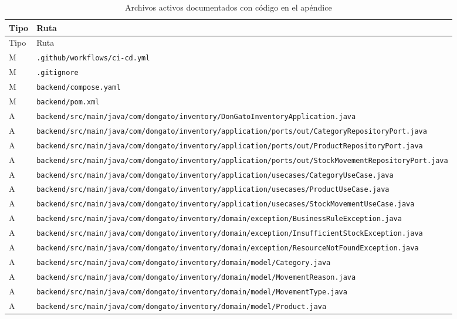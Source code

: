 \documentclass[11pt,oneside]{report}
\newcommand{\pathcode}[1]{{\ttfamily\scriptsize\nolinkurl{#1}}}
\begin{document}
\begin{longtable}{p{1.5cm} p{13cm}}
\caption{Archivos activos documentados con código en el apéndice}\\
\toprule
Tipo & Ruta \\
\midrule
\endfirsthead
\toprule
Tipo & Ruta \\
\midrule
\endhead
M & \pathcode{.github/workflows/ci-cd.yml}\\
M & \pathcode{.gitignore}\\
M & \pathcode{backend/compose.yaml}\\
M & \pathcode{backend/pom.xml}\\
A & \pathcode{backend/src/main/java/com/dongato/inventory/DonGatoInventoryApplication.java}\\
A & \pathcode{backend/src/main/java/com/dongato/inventory/application/ports/out/CategoryRepositoryPort.java}\\
A & \pathcode{backend/src/main/java/com/dongato/inventory/application/ports/out/ProductRepositoryPort.java}\\
A & \pathcode{backend/src/main/java/com/dongato/inventory/application/ports/out/StockMovementRepositoryPort.java}\\
A & \pathcode{backend/src/main/java/com/dongato/inventory/application/usecases/CategoryUseCase.java}\\
A & \pathcode{backend/src/main/java/com/dongato/inventory/application/usecases/ProductUseCase.java}\\
A & \pathcode{backend/src/main/java/com/dongato/inventory/application/usecases/StockMovementUseCase.java}\\
A & \pathcode{backend/src/main/java/com/dongato/inventory/domain/exception/BusinessRuleException.java}\\
A & \pathcode{backend/src/main/java/com/dongato/inventory/domain/exception/InsufficientStockException.java}\\
A & \pathcode{backend/src/main/java/com/dongato/inventory/domain/exception/ResourceNotFoundException.java}\\
A & \pathcode{backend/src/main/java/com/dongato/inventory/domain/model/Category.java}\\
A & \pathcode{backend/src/main/java/com/dongato/inventory/domain/model/MovementReason.java}\\
A & \pathcode{backend/src/main/java/com/dongato/inventory/domain/model/MovementType.java}\\
A & \pathcode{backend/src/main/java/com/dongato/inventory/domain/model/Product.java}\\

\end{longtable}
\end{document}
